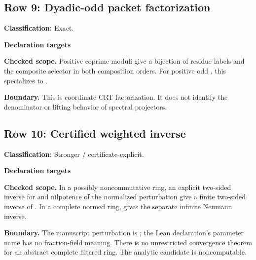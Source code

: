 \subsection{Row 9: Dyadic-odd packet factorization}
\label{row:9}
\textbf{Classification:} Exact.
\par\smallskip\textbf{Declaration targets}\par
{\small\noindent{}\par}
{\small\noindent{}\par}
{\small\noindent{}\par}
{\small\noindent{}\par}
{\small\noindent{}\par}
{\small\noindent{}\par}
{\small\noindent{}\par}
\smallskip\textbf{Checked scope.} Positive coprime moduli give a bijection of residue labels and the composite selector in both composition orders. For positive odd , this specializes to .
\par\smallskip\textbf{Boundary.} This is coordinate CRT factorization. It does not identify the denominator or lifting behavior of spectral projectors.
\medskip
{}
\subsection{Row 10: Certified weighted inverse}
\label{row:10}
\textbf{Classification:} Stronger / certificate-explicit.
\par\smallskip\textbf{Declaration targets}\par
{\small\noindent{}\par}
{\small\noindent{}\par}
{\small\noindent{}\par}
{\small\noindent{}\par}
{\small\noindent{}\par}
\smallskip\textbf{Checked scope.} In a possibly noncommutative ring, an explicit two-sided inverse for  and nilpotence of the normalized perturbation  give a finite two-sided inverse of . In a complete normed ring,  gives the separate infinite Neumann inverse.
\par\smallskip\textbf{Boundary.} The manuscript perturbation is ; the Lean declaration's parameter name  has no fraction-field meaning. There is no unrestricted convergence theorem for an abstract complete filtered ring. The analytic candidate is noncomputable.
\medskip
{}

